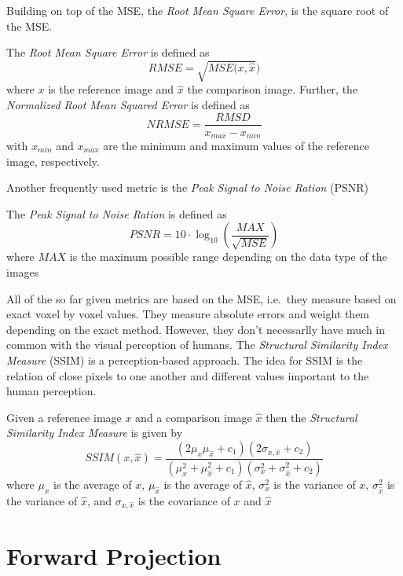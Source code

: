 Building on top of the MSE, the \textit{Root Mean Square Error}, is the square root of the MSE.
\begin{definition}
	The \textit{Root Mean Square Error} is defined as
	\[ RMSE = \sqrt{MSE(x, \hat{x}}) \]
	where \(x\) is the reference image and \(\hat{x}\) the comparison image. Further, the
	\textit{Normalized Root Mean Squared Error} is defined as
	\[ NRMSE = \frac{RMSD}{x_{max} - x_{min}} \]
	with \(x_{min}\) and \(x_{max}\) are the minimum and maximum values of the reference image,
	respectively.
\end{definition}
Another frequently used metric is the \textit{Peak Signal to Noise Ration} (PSNR)
\begin{definition}
	The \textit{Peak Signal to Noise Ration} is defined as
	\[ PSNR = 10 \cdot \log_{10}\left( \frac{MAX}{\sqrt{MSE}} \right) \]
	where \(MAX\) is the maximum possible range depending on the data type of the images
\end{definition}
All of the so far given metrics are based on the MSE, i.e.\ they measure based on exact voxel by
voxel values. They measure absolute errors and weight them depending on the exact method. However,
they don't necessarlly have much in common with the visual perception of humans. The
\textit{Structural Similarity Index Measure} (SSIM) is a perception-based approach. The idea for
SSIM is the relation of close pixels to one another and different values important to the human
perception.
\begin{definition}
	Given a reference image \(x\) and a comparison image \(\hat{x}\) then the \textit{Structural
		Similarity Index Measure} is given by
	\[ SSIM(x, \hat{x}) = \frac{\left(2 \mu_x \mu_{\hat{x}} + c_1\right) \left( 2
			\sigma_{x, \hat{x}} + c_2 \right)}{\left(\mu_x^2
			+ \mu_{\hat{x}}^2 + c_1 \right) \left( \sigma_x^2 + \sigma_{\hat{x}}^2 + c_2 \right)} \]
	where \(\mu_x\) is the average of \(x\), \(\mu_{\hat{x}}\) is the average of \(\hat{x}\),
	\(\sigma_x^2\) is the variance of \(x\), \(\sigma_{\hat{x}}^2\) is the variance of
	\(\hat{x}\), and \(\sigma_{x, \hat{x}}\) is the covariance of \(x\) and \(\hat{x}\)
\end{definition}


\section{Forward Projection}\label{sec:experiments_forward_projection}

